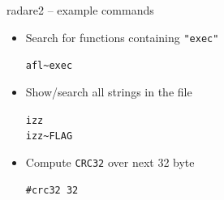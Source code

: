 {%





}

\begin{frame}[fragile]
  {radare2 -- example commands}

  \begin{itemize}
    \item Search for functions containing \verb+"exec"+ \\
      \begin{center}
        \verb!afl~exec!
      \end{center}
    \item Show/search all strings in the file \\
      \begin{center}
        \texttt{izz} \\
        \verb!izz~FLAG!
      \end{center}
    \item Compute \texttt{CRC32} over next 32 byte \\
      \begin{center}
        \verb+#crc32 32+
      \end{center}
  \end{itemize}

\end{frame}


